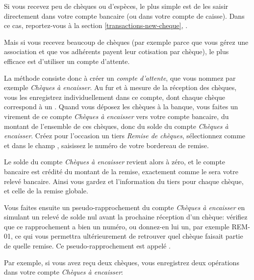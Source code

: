 Si vous recevez peu de chèques ou d'espèces, le plus simple est de les saisir directement dans votre compte bancaire (ou dans votre compte de caisse). Dans ce cas, reportez-vous à la section \vref{transactions-new-cheque}, .

Mais si vous recevez beaucoup de chèques (par exemple parce que vous gérez une association et que vos adhérents payent leur cotisation par chèque), le plus efficace est d'utiliser un compte d'attente.

La méthode consiste donc à créer un \emph{compte d'attente}, que vous nommez par exemple \emph{Chèques à encaisser}. Au fur et à mesure de la réception des chèques, vous les enregistrez individuellement dans ce compte, dont chaque chèque correspond à un . Quand vous déposez les chèques à la banque, vous faites un virement de ce compte \emph{Chèques à encaisser} vers votre compte bancaire, du montant de l'ensemble de ces chèques, donc du solde du compte \emph{Chèques à encaisser}. Créez pour l'occasion un tiers \emph{Remise de chèques}, sélectionnez  comme  et dans le champ , saisissez le numéro de votre bordereau de remise.

Le solde du compte \emph{Chèques à encaisser} revient alors à zéro, et le compte bancaire est crédité du montant de la remise, exactement comme le sera votre relevé bancaire. Ainsi vous gardez et l'information du tiers pour chaque chèque, et celle de la remise globale.

Vous faites ensuite un pseudo-rapprochement du compte \emph{Chèques à encaisser} en simulant un relevé de solde nul avant la prochaine réception d'un chèque: vérifiez que ce rapprochement a bien un numéro, ou donnez-en lui un, par exemple REM-01, ce qui vous permettra ultérieurement de retrouver quel chèque faisait partie de quelle remise. Ce pseudo-rapprochement est appelé \emph{}.


Par exemple, si vous avez reçu deux chèques, vous enregistrez deux opérations dans votre compte \emph{Chèques à encaisser}:


